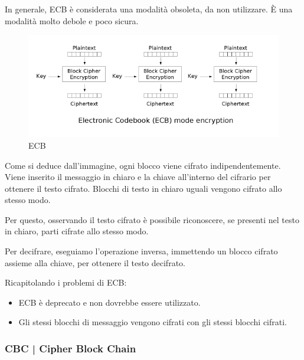  

\textsf{\small In generale, ECB è considerata una modalità obsoleta, da non utilizzare. È una modalità molto debole e poco sicura.}

\begin{figure}[H]
	\centering
	\includegraphics[width=.9\textwidth, height=.9\textheight, keepaspectratio]{./images/aes_modes/ecb_encryption.png} %
	\caption{ECB}
	\label{fig:ecb}
\end{figure}

\textsf{\small Come si deduce dall'immagine, ogni blocco viene cifrato indipendentemente. Viene inserito il messaggio in chiaro e la chiave all'interno del cifrario per ottenere il testo cifrato. Blocchi di testo in chiaro uguali vengono cifrato allo stesso modo.}

\textsf{\small Per questo, osservando il testo cifrato è possibile riconoscere, se presenti nel testo in chiaro, parti cifrate allo stesso modo. }

\textsf{\small Per decifrare, eseguiamo l'operazione inversa, immettendo un blocco cifrato assieme alla chiave, per ottenere il testo decifrato.}


\textsf{\small Ricapitolando i problemi di ECB:}

\begin{itemize}
	\item \textsf{\small ECB è deprecato e non dovrebbe essere utilizzato.}
	\item \textsf{\small Gli stessi blocchi di messaggio vengono cifrati con gli stessi blocchi cifrati.}
\end{itemize}


\subsubsection{CBC | Cipher Block Chain}

